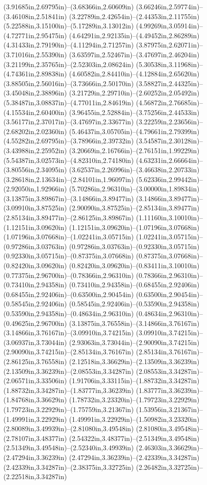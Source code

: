 (3.91685in,2.69795in)--(3.68366in,2.60609in) (3.66246in,2.59774in)--(3.46108in,2.51841in) (3.22789in,2.42654in)--(2.44353in,2.11755in) (5.22588in,3.15100in)--(5.17289in,3.13012in) (4.99269in,3.05914in)--(4.72771in,2.95475in) (4.64291in,2.92135in)--(4.49452in,2.86289in) (4.31433in,2.79190in)--(4.11294in,2.71257in) (3.87975in,2.62071in)--(3.71016in,2.55390in) (3.63597in,2.52467in)--(3.47697in,2.46204in) (3.21199in,2.35765in)--(2.52303in,2.08624in) (5.30538in,3.11968in)--(4.74361in,2.89838in) (4.60582in,2.84410in)--(4.12884in,2.65620in) (3.88505in,2.56016in)--(3.73666in,2.50170in) (3.58827in,2.44325in)--(3.45048in,2.38896in) (3.21729in,2.29710in)--(2.60252in,2.05492in) (5.38487in,3.08837in)--(4.77011in,2.84619in) (4.56872in,2.76685in)--(4.15534in,2.60400in) (3.96455in,2.52884in)--(3.75256in,2.44533in) (3.56177in,2.37017in)--(3.47697in,2.33677in) (3.22259in,2.23656in)--(2.68202in,2.02360in) (5.46437in,3.05705in)--(4.79661in,2.79399in) (4.55282in,2.69795in)--(3.78966in,2.39732in) (3.54587in,2.30128in)--(3.43988in,2.25952in) (3.20669in,2.16766in)--(2.76151in,1.99229in) (5.54387in,3.02573in)--(4.82310in,2.74180in) (4.63231in,2.66664in)--(3.80556in,2.34095in) (3.62537in,2.26996in)--(3.46638in,2.20733in) (3.28618in,2.13634in)--(2.84101in,1.96097in) (5.62336in,2.99442in)--(2.92050in,1.92966in) (5.70286in,2.96310in)--(3.00000in,1.89834in) (3.13875in,3.89867in)--(3.14866in,3.89477in) (3.14866in,3.89477in)--(3.09910in,3.87525in) (2.90090in,3.87525in)--(2.85134in,3.89477in) (2.85134in,3.89477in)--(2.86125in,3.89867in) (1.11160in,3.10010in)--(1.12151in,3.09620in) (1.12151in,3.09620in)--(1.07196in,3.07668in) (1.07196in,3.07668in)--(1.02241in,3.05715in) (1.02241in,3.05715in)--(0.97286in,3.03763in) (0.97286in,3.03763in)--(0.92330in,3.05715in) (0.92330in,3.05715in)--(0.87375in,3.07668in) (0.87375in,3.07668in)--(0.82420in,3.09620in) (0.82420in,3.09620in)--(0.83411in,3.10010in) (0.77375in,2.96700in)--(0.78366in,2.96310in) (0.78366in,2.96310in)--(0.73410in,2.94358in) (0.73410in,2.94358in)--(0.68455in,2.92406in) (0.68455in,2.92406in)--(0.63500in,2.90454in) (0.63500in,2.90454in)--(0.58545in,2.92406in) (0.58545in,2.92406in)--(0.53590in,2.94358in) (0.53590in,2.94358in)--(0.48634in,2.96310in) (0.48634in,2.96310in)--(0.49625in,2.96700in) (3.13875in,3.76558in)--(3.14866in,3.76167in) (3.14866in,3.76167in)--(3.09910in,3.74215in) (3.09910in,3.74215in)--(3.06937in,3.73044in) (2.93063in,3.73044in)--(2.90090in,3.74215in) (2.90090in,3.74215in)--(2.85134in,3.76167in) (2.85134in,3.76167in)--(2.86125in,3.76558in) (2.12518in,3.36629in)--(2.13509in,3.36239in) (2.13509in,3.36239in)--(2.08553in,3.34287in) (2.08553in,3.34287in)--(2.06571in,3.33506in) (1.91706in,3.33115in)--(1.88732in,3.34287in) (1.88732in,3.34287in)--(1.83777in,3.36239in) (1.83777in,3.36239in)--(1.84768in,3.36629in) (1.78732in,3.23320in)--(1.79723in,3.22929in) (1.79723in,3.22929in)--(1.75759in,3.21367in) (1.53956in,3.21367in)--(1.49991in,3.22929in) (1.49991in,3.22929in)--(1.50982in,3.23320in) (2.80089in,3.49939in)--(2.81080in,3.49548in) (2.81080in,3.49548in)--(2.78107in,3.48377in) (2.54322in,3.48377in)--(2.51349in,3.49548in) (2.51349in,3.49548in)--(2.52340in,3.49939in) (2.46303in,3.36629in)--(2.47294in,3.36239in) (2.47294in,3.36239in)--(2.42339in,3.34287in) (2.42339in,3.34287in)--(2.38375in,3.32725in) (2.26482in,3.32725in)--(2.22518in,3.34287in) 